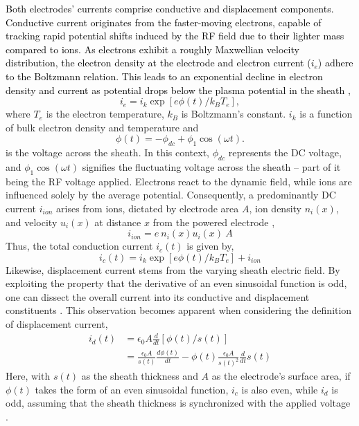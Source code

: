 \documentclass[12pt]{iopart}
\begin{document}
\textcolor{black}{Both electrodes' currents comprise conductive and displacement components. Conductive current originates from the faster-moving electrons, capable of tracking rapid potential shifts induced by the RF field due to their lighter mass compared to ions. As electrons exhibit a roughly Maxwellian velocity distribution, the electron density at the electrode and electron current ($i_e$) adhere to the Boltzmann relation. This leads to an exponential decline in electron density and current as potential drops below the plasma potential in the sheath \cite{sobolewski1995electrical},}
\begin{equation} 
    i_e=i_k\exp[e\phi\left(t\right)/k_B T_e],
    \label{eqn:electron conduction}
\end{equation}
where $T_e$ is the electron temperature, $k_B$ is Boltzmann's constant. $i_k$ is a function of bulk electron density and temperature \cite{sobolewski1995electrical} and
\begin{equation} 
    \phi\left(t\right) = -\phi_{dc} + \phi_1\cos(\omega t).
    \label{eqn:sheath voltage}
\end{equation}
is the voltage across the sheath.  In this context, $\phi_{dc}$ represents the DC voltage, and $\phi_1\cos(\omega t)$ signifies the fluctuating voltage across the sheath – part of it being the RF voltage applied. Electrons react to the dynamic field, while ions are influenced solely by the average potential. Consequently, a predominantly DC current $i_{ion}$ arises from ions, dictated by electrode area $A$, ion density $n_i(x)$, and velocity $u_i(x)$ at distance $x$ from the powered electrode \cite{sobolewski1995electrical},
\begin{equation} 
    i_{ion}=e\ n_i\left(x\right)u_i\left(x\right)\ A 
\end{equation} 
Thus, the total conduction current $i_c\left(t\right)$ is given by, 
\begin{equation}
i_c\left(t\right)=i_k\exp[e\phi\left(t\right)/k_BT_e]+i_{ion}
\label{eqn:conduction_current}
\end{equation}
Likewise, displacement current stems from the varying sheath electric field. By exploiting the property that the derivative of an even sinusoidal function is odd, one can dissect the overall current into its conductive and displacement constituents \cite{sobolewski1995electrical}. This observation becomes apparent when considering the definition of displacement current, 
\begin{eqnarray}
    i_d\left(t\right) &=\epsilon_0A\frac{d}{dt}[\phi \left(t\right)/ s\left(t\right)] \\
    &=\frac{\epsilon_0A} {s\left(t\right)}\frac{d\phi \left(t\right)}{dt}-\phi \left(t\right)\frac{\epsilon_0A}{s\left(t\right)^2}\frac{d}{dt}s\left(t\right)
\label{eqn:displacement_current}
\end{eqnarray}
Here, with $s\left(t\right)$ as the sheath thickness and $A$ as the electrode's surface area, if $\phi\left(t\right)$ takes the form of an even sinusoidal function, $i_c$ is also even, while $i_d$ is odd, assuming that the sheath thickness is synchronized with the applied voltage \cite{panagopoulos1999plasma}. 
\end{document}
